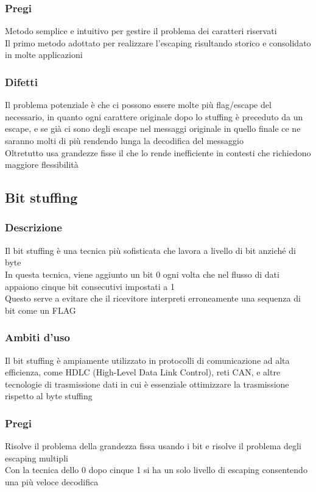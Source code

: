 \documentclass[10pt,oneside,a4paper]{article}
\begin{document}
\subsubsection{Pregi}
Metodo semplice e intuitivo per gestire il problema dei caratteri riservati\\
Il primo metodo adottato per realizzare l'escaping risultando storico e consolidato in molte applicazioni
\subsubsection{Difetti}
Il problema potenziale è che ci possono essere molte più flag/escape del necessario, in quanto ogni carattere originale dopo lo stuffing è preceduto da un escape, e se già ci sono degli escape nel messaggi originale in quello finale ce ne saranno molti di più rendendo lunga la decodifica del messaggio\\
Oltretutto usa grandezze fisse il che lo rende inefficiente in contesti che richiedono maggiore flessibilità
\subsection{Bit stuffing}
\subsubsection{Descrizione}
Il bit stuffing è una tecnica più sofisticata che lavora a livello di bit anziché di byte\\
In questa tecnica, viene aggiunto un bit 0 ogni volta che nel flusso di dati appaiono cinque bit consecutivi impostati a 1\\ Questo serve a evitare che il ricevitore interpreti erroneamente una sequenza di bit come un FLAG 
\subsubsection{Ambiti d'uso}
Il bit stuffing è ampiamente utilizzato in protocolli di comunicazione ad alta efficienza, come HDLC (High-Level Data Link Control), reti CAN, e altre tecnologie di trasmissione dati in cui è essenziale ottimizzare la trasmissione rispetto al byte stuffing
\subsubsection{Pregi}
Risolve il problema della grandezza fissa usando i bit e risolve il problema degli escaping multipli\\
Con la tecnica dello 0 dopo cinque 1 si ha un solo livello di escaping consentendo una più veloce decodifica
\end{document}
